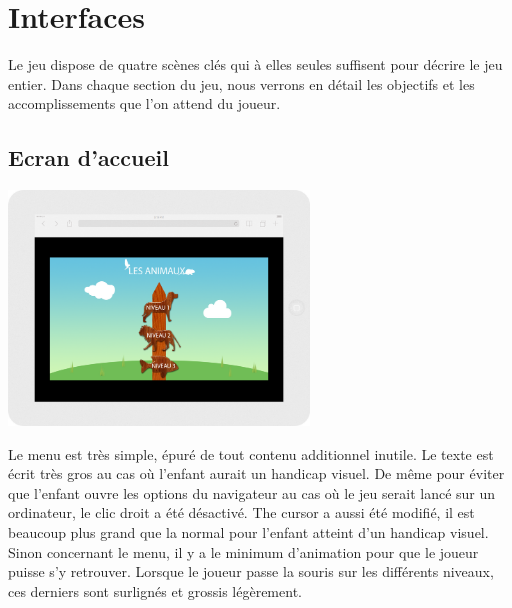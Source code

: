 \documentclass{article}
\begin{document}
\section{Interfaces}
\hspace*{0.6cm}Le jeu dispose de quatre scènes clés qui à elles seules suffisent pour décrire le jeu entier. Dans chaque section du jeu, nous verrons en détail les objectifs et les accomplissements que l'on attend du joueur. 
\subsection{Ecran d'accueil}
\vspace{0.5cm}
\begin{center}
\includegraphics[width=0.6\textwidth]{page1}
\end{center}
\vspace{0.5cm}
\hspace*{0.6cm}Le menu est très simple, épuré de tout contenu additionnel inutile. Le texte est écrit très gros au cas où l'enfant aurait un handicap visuel. De même pour éviter que l'enfant ouvre les options du navigateur au cas où le jeu serait lancé sur un ordinateur, le clic droit a été désactivé. The cursor a aussi été modifié, il est beaucoup plus grand que la normal pour l'enfant atteint d'un handicap visuel.
\vspace{0.5cm}\\
\hspace*{0.6cm}Sinon concernant le menu, il y a le minimum d'animation pour que le joueur puisse s'y retrouver. Lorsque le joueur passe la souris sur les différents niveaux, ces derniers sont surlignés et grossis légèrement.
\end{document}
